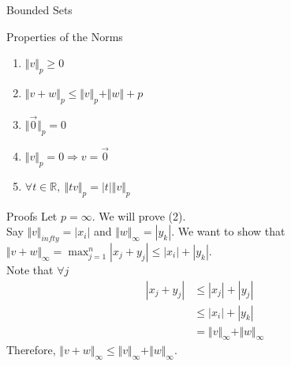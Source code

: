 \documentclass[8pt]{extarticle}
\newcommand{\R}{\mathbb{R}}
\begin{document}
\begin{problem}{Bounded Sets}
\begin{problem}{Properties of the Norms}
\begin{description}
          \begin{enumerate}[(1)]
            \item $\Vert v\Vert_p \geq 0$
            \item $\Vert v+w \Vert_p \leq \Vert v\Vert_p + \Vert w \Vert+p$
            \item $\Vert \vec{0}\Vert_p = 0$
            \item $\Vert v\Vert_p = 0 \Rightarrow v = \vec{0}$
            \item $\forall t\in \R,~\Vert tv \Vert_{p} = |t| \Vert v \Vert_p$ 
          \end{enumerate}
      \end{description}
      \begin{problem}{Proofs}
        Let $p = \infty$. We will prove (2).\\

        Say $\Vert v \Vert_{infty} = |x_i|$ and $\Vert w \Vert_{\infty} = |y_k|$. We want to show that $\Vert v + w \Vert_{\infty} = \max_{j=1}^{n}|x_j + y_j| \leq |x_i| + |y_k|$.\\

        Note that $\forall j$
        \begin{align*}
          |x_j + y_j| &\leq |x_j| + |y_j| \tag*{Triangle Inequality}\\
                      &\leq |x_i| + |y_k| \\
                      &= \Vert v \Vert_{\infty} + \Vert w \Vert_{\infty}
        \end{align*}
        Therefore, $\Vert v + w \Vert_{\infty} \leq \Vert v \Vert_{\infty} + \Vert w \Vert_{\infty}$.
      \end{problem}
    \end{problem}
  \end{problem}
\end{document}
